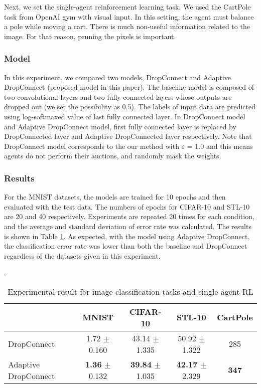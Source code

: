 Next, we set the single-agent reinforcement learning task.
We used the CartPole task from OpenAI gym with visual input.
In this setting, the agent must balance a pole while moving a cart.
There is much non-useful information related to the image. For that reason, pruning the pixels is important.

\subsubsection{Model}
In this experiment, we compared two models, DropConnect and Adaptive DropConnect (proposed model in this paper). The baseline model is composed of two convolutional layers and two fully connected layers whose outputs are dropped out (we set the possibility as 0.5). The labels of input data are predicted using log-softmaxed value of last fully connected layer. In DropConnect model and Adaptive DropConnect model, first fully connected layer is replaced by DropConnected layer  and Adaptive DropConnected layer respectively. Note that DropConnect model corresponds to the our method with $\varepsilon$ = 1.0 and this means agents do not perform their auctions, and randomly mask the weights.

\subsubsection{Results}
For the MNIST datasets, the models are trained for 10 epochs and then evaluated with the test data. The numbers of epochs for CIFAR-10 and STL-10 are 20 and 40 respectively. Experiments are repeated 20 times for each condition, and the average and standard deviation of  error rate was calculated. The results is shown in Table \ref{tbl:cls}. As expected, with the model using Adaptive DropConnect, the classification error rate was lower than both the baseline and DropConnect regardless of the datasets given in this experiment.


\begin{table}[h]
	\caption{ Experimental result for image classification tasks and single-agent RL }\label{tbl:cls}. 
\centering
\begin{tabular}{l|ccc|c}
\hline
		& MNIST & CIFAR-10 & STL-10 & CartPole \\
\hline
		DropConnect \citep{wan2013regularization}	&	1.72 $\pm$ 0.160	&	43.14 $\pm$ 1.335	&	50.92 $\pm$ 1.322 & 285 \\
		Adaptive DropConnect	&	\textbf{1.36} $\pm$ 0.132	&	\textbf{39.84} $\pm$ 1.035	&	\textbf{42.17} $\pm$ 2.329 & \textbf{347} \\
\hline
\end{tabular}
\end{table}

